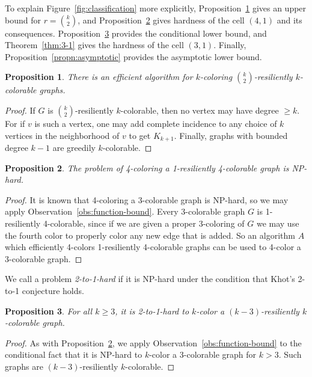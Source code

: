 \documentclass{llncs}
\newtheorem{propn}{Proposition}
\begin{document}
To explain Figure~\ref{fig:classification} more explicitly,
Proposition~\ref{propn:k-choose-2-bound} gives an upper bound for $r=
\binom{k}{2}$, and Proposition~\ref{propn:4-1} gives hardness of the cell $(4,1)$
and its consequences. Proposition~\ref{propn:2-to-1-diagonal} provides the
conditional lower bound, and Theorem~\ref{thm:3-1} gives the hardness of the cell
$(3,1)$. Finally, Proposition~\ref{propn:asymptotic} provides the asymptotic
lower bound.

\begin{propn}\label{propn:k-choose-2-bound}
There is an efficient algorithm for $k$-coloring $\binom{k}{2}$-resiliently
$k$-colorable graphs.
\end{propn}
\begin{proof}
If $G$ is $\binom{k}{2}$-resiliently $k$-colorable, then no vertex may have
degree $ \geq k$. For if $v$ is such a vertex, one may add complete incidence to
any choice of $k$ vertices in the neighborhood of $v$ to get $K_{k+1}$. Finally,
graphs with bounded degree $k-1$ are greedily $k$-colorable. 
\end{proof}

\begin{propn}\label{propn:4-1}
The problem of 4-coloring a 1-resiliently 4-colorable graph is NP-hard.
\end{propn}
\begin{proof}
It is known that 4-coloring a 3-colorable graph is NP-hard, so we may apply
Observation~\ref{obs:function-bound}. Every 3-colorable graph $G$ is
1-resiliently 4-colorable, since if we are given a proper 3-coloring of $G$ we
may use the fourth color to properly color any new edge that is added. So an
algorithm $A$ which efficiently 4-colors 1-resiliently 4-colorable graphs can be
used to 4-color a 3-colorable graph.
\end{proof}

We call a problem \emph{2-to-1-hard} if it is NP-hard under the condition that
Khot's 2-to-1 conjecture holds.

\begin{propn}\label{propn:2-to-1-diagonal}
For all $k \geq 3$, it is 2-to-1-hard to $k$-color a $(k-3)$-resiliently
$k$-colorable graph. 
\end{propn}
\begin{proof}
As with Proposition~\ref{propn:4-1}, we apply Observation~\ref{obs:function-bound}
to the conditional fact that it is NP-hard to $k$-color a 3-colorable graph for
$k > 3$. Such graphs are $(k-3)$-resiliently $k$-colorable.
\end{proof}
\end{document}
